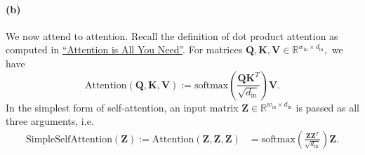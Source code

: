 \documentclass{exam}
\begin{document}
\paragraph{(b)} 
We now attend to attention. Recall the definition of dot product attention as computed in \href{https://arxiv.org/pdf/1706.03762.pdf}{``Attention is All You Need''}. For matrices $\mathbf{Q}, \mathbf{K}, \mathbf{V} \in \mathbb{R}^{w_{\text{in}} \times d_{\text{in}}},$ we have
\begin{equation}
\label{eq:attention}
    \text{Attention}(\mathbf{Q}, \mathbf{K}, \mathbf{V}) := \text{softmax}\left( \frac{\mathbf{Q} \mathbf{K}^T}{\sqrt{d_{\text{in}}}}\right)\mathbf{V}.
\end{equation}
In the simplest form of self-attention, an input matrix $\mathbf{Z} \in \mathbb{R}^{w_{\text{in}} \times d_{\text{in}}}$ is passed as all three arguments, i.e.
\begin{align*}
    \text{SimpleSelfAttention}(\mathbf{Z}) := \text{Attention}(\mathbf{Z},\mathbf{Z},\mathbf{Z}) &= \text{softmax}\left( \frac{\mathbf{Z} \mathbf{Z}^T}{\sqrt{d_{\text{in}}}}\right)\mathbf{Z}.
\end{align*}
\end{document}
